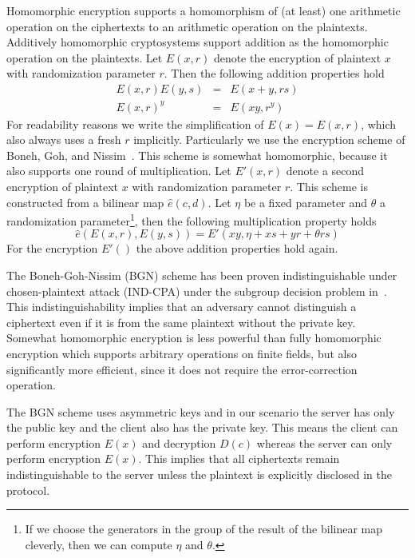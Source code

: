 \documentclass{llncs}
\begin{document}
Homomorphic encryption supports a homomorphism of (at least) one arithmetic operation on the ciphertexts to an arithmetic operation on the plaintexts.
Additively homomorphic cryptosystems support addition as the homomorphic operation on the plaintexts.
Let $E(x, r)$ denote the encryption of plaintext $x$ with randomization parameter $r$.
Then the following addition properties hold
\begin{eqnarray*}
E(x, r) E(y, s) & = & E(x + y, rs) \\
E(x, r)^y       & = & E(x y, r^y)
\end{eqnarray*}
For readability reasons we write the simplification of $E(x) = E(x,r)$, which also always uses a fresh $r$ implicitly.
Particularly we use the encryption scheme of Boneh, Goh, and Nissim~\cite{BonGoh05}.
This scheme is somewhat homomorphic, because it also supports one round of multiplication.
Let $E'(x, r)$ denote a second encryption of plaintext $x$ with randomization parameter $r$.
This scheme is constructed from a bilinear map $\hat{e}(c, d)$.
Let $\eta$ be a fixed parameter and $\theta$ a randomization parameter\footnote{If we choose the generators in the group of the result of the bilinear map cleverly, then we can compute $\eta$ and $\theta$.}, then the following multiplication property holds
\begin{displaymath}
\hat{e}(E(x, r), E(y, s)) = E'(x y, \eta + xs + yr + {\theta}rs)
\end{displaymath}
For the encryption $E'()$ the above addition properties hold again.

The Boneh-Goh-Nissim (BGN) scheme has been proven indistinguishable under chosen-plaintext attack (IND-CPA) under the subgroup decision problem in~\cite{BonGoh05}.
This indistinguishability implies that an adversary cannot distinguish a ciphertext even if it is from the same plaintext without the private key.
Somewhat homomorphic encryption is less powerful than fully homomorphic encryption which supports arbitrary operations on finite fields, but also significantly more efficient, since it does not require the error-correction operation.

The BGN scheme uses asymmetric keys and in our scenario the server has only the public key and the client also has the private key.
This means the client can perform encryption $E(x)$ and decryption $D(c)$ whereas the server can only perform encryption $E(x)$.
This implies that all ciphertexts remain indistinguishable to the server unless the plaintext is explicitly disclosed in the protocol.
\end{document}
